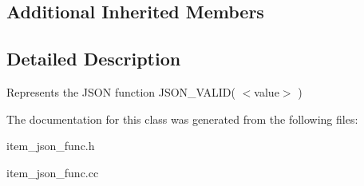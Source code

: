 \subsection*{Additional Inherited Members}


\subsection{Detailed Description}
Represents the J\+S\+ON function J\+S\+O\+N\+\_\+\+V\+A\+L\+I\+D( $<$value$>$ ) 

The documentation for this class was generated from the following files\+:\begin{DoxyCompactItemize}
\item 
item\+\_\+json\+\_\+func.\+h\item 
item\+\_\+json\+\_\+func.\+cc\end{DoxyCompactItemize}
